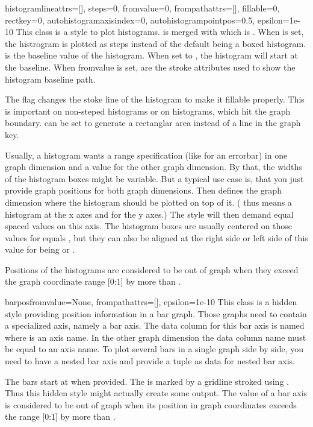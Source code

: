 \begin{classdesc}{histogram}{lineattrs=[], steps=0, fromvalue=0, %
                             frompathattrs=[], fillable=0, rectkey=0,
                             autohistogramaxisindex=0,
                             autohistogrampointpos=0.5, epsilon=1e-10}
  This class is a style to plot histograms.  is merged
  with  which is . When
   is set, the histrogram is plotted as steps instead of
  the default being a boxed histogram.  is the baseline
  value of the histogram. When set to , the histogram will
  start at the baseline. When fromvalue is set, 
  are the stroke attributes used to show the histogram baseline path.

  The  flag changes the stoke line of the histogram to
  make it fillable properly. This is important on non-steped
  histograms or on histograms, which hit the graph boundary.
   can be set to generate a rectanglar area instead of a
  line in the graph key.

  Usually, a histogram wants a range specification (like for an
  errorbar) in one graph dimension and a value for the other graph
  dimension. By that, the widths of the histogram boxes might be
  variable. But a typical use case is, that you just provide graph
  positions for both graph dimensions. Then
   defines the graph dimension where the
  histogram should be plotted on top of it. ( thus means a
  histogram at the x axes and  for the y axes.) The style will
  then demand equal spaced values on this axis. The histogram boxes
  are usually centered on those values for 
  equals , but they can also be aligned at the right side or
  left side of this value for  being
   or .

  Positions of the histograms are considered to be out of graph when
  they exceed the graph coordinate range [0:1] by more than
  .
\end{classdesc} %

\begin{classdesc}{barpos}{fromvalue=None, frompathattrs=[], epsilon=1e-10} %
  This class is a hidden style providing position information in a bar
  graph. Those graphs need to contain a specialized axis, namely a bar
  axis. The data column for this bar axis is named  where
   is an axis name. In the other graph dimension the data
  column name must be equal to an axis name. To plot several bars in a
  single graph side by side, you need to have a nested bar axis and
  provide a tuple as data for nested bar axis.

  The bars start at  when provided. The 
  is marked by a gridline stroked using . Thus this
  hidden style might actually create some output. The value of a bar
  axis is considered to be out of graph when its position in graph
  coordinates exceeds the range [0:1] by more than .
\end{classdesc} %


